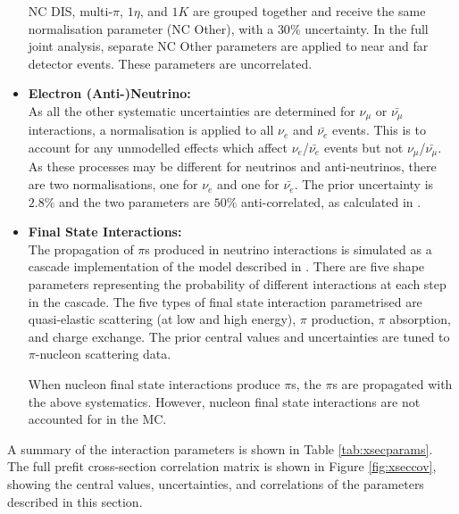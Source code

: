 \begin{itemize}
NC DIS, multi-$\pi$, $1\eta$, and $1K$ are grouped together and receive the same normalisation parameter (NC Other), with a $30\%$ uncertainty. In the full joint analysis, separate NC Other parameters are applied to near and far detector events. These parameters are uncorrelated.

\item \textbf{Electron (Anti-)Neutrino:}\\
As all the other systematic uncertainties are determined for $\nu_{\mu}$ or $\bar{\nu_{\mu}}$ interactions, a normalisation is applied to all $\nu_{e}$ and $\bar{\nu_{e}}$ events. This is to account for any unmodelled effects which affect $\nu_{e}$/$\bar{\nu_{e}}$ events but not $\nu_{\mu}$/$\bar{\nu_{\mu}}$. As these processes may be different for neutrinos and anti-neutrinos, there are two normalisations, one for $\nu_{e}$ and one for $\bar{\nu_{e}}$. The prior uncertainty is $2.8\%$ and the two parameters are $50\%$ anti-correlated, as calculated in \cite{nuenuebar}.

\item \textbf{Final State Interactions:} \\
The propagation of $\pi$s produced in neutrino interactions is simulated as a cascade implementation of the model described in \cite{fsicascade}. There are five shape parameters representing the probability of different interactions at each step in the cascade. The five types of final state interaction parametrised are quasi-elastic scattering (at low and high energy), $\pi$ production, $\pi$ absorption, and charge exchange. The prior central values and uncertainties are tuned to $\pi$-nucleon scattering data\cite{fsiscatt}.

When nucleon final state interactions produce $\pi$s, the $\pi$s are propagated with the above systematics. However, nucleon final state interactions are not accounted for in the MC.

\end{itemize}

A summary of the interaction parameters is shown in Table \ref{tab:xsecparams}. The full prefit cross-section correlation matrix is shown in Figure \ref{fig:xseccov}, showing the central values, uncertainties, and correlations of the parameters described in this section.

